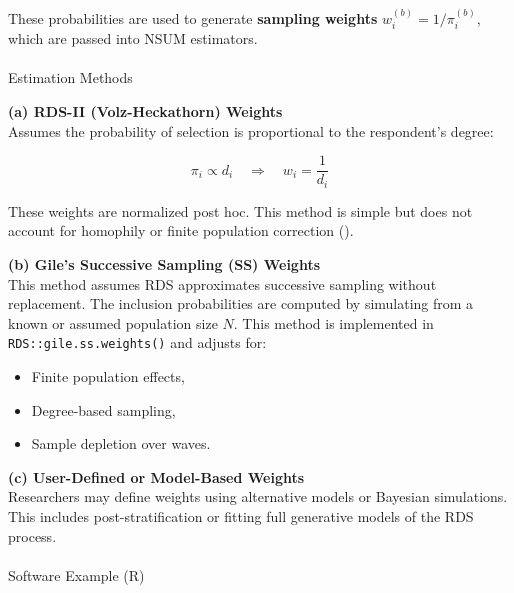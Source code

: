 \documentclass[
  12pt,
  letterpaper,
  DIV=11,
  numbers=noendperiod]{scrartcl}
\makeatletter
\let\oldparagraph\paragraph
\renewcommand{\paragraph}{
    \@ifstar
      \xxxParagraphStar
      \xxxParagraphNoStar
  }
\newcommand{\xxxParagraphStar}[1]{\oldparagraph*{#1}\mbox{}}
\newcommand{\xxxParagraphNoStar}[1]{\oldparagraph{#1}\mbox{}}
\newenvironment{Shaded}{\begin{snugshade}}{\end{snugshade}}
\newcommand{\AttributeTok}[1]{\textcolor[rgb]{0.40,0.45,0.13}{#1}}
\newcommand{\DecValTok}[1]{\textcolor[rgb]{0.68,0.00,0.00}{#1}}
\newcommand{\FunctionTok}[1]{\textcolor[rgb]{0.28,0.35,0.67}{#1}}
\newcommand{\NormalTok}[1]{\textcolor[rgb]{0.00,0.23,0.31}{#1}}
\newcommand{\OtherTok}[1]{\textcolor[rgb]{0.00,0.23,0.31}{#1}}
\newcommand{\SpecialCharTok}[1]{\textcolor[rgb]{0.37,0.37,0.37}{#1}}
\newcommand{\StringTok}[1]{\textcolor[rgb]{0.13,0.47,0.30}{#1}}
\theoremstyle{plain}
\theoremstyle{definition}
\makeatother
\begin{document}
These probabilities are used to generate \textbf{sampling weights}
\(w_i^{(b)} = 1/\pi_i^{(b)}\), which are passed into NSUM estimators.

\paragraph{Estimation Methods}\label{estimation-methods-1}

\textbf{(a) RDS-II (Volz-Heckathorn) Weights}\\
Assumes the probability of selection is proportional to the respondent's
degree:

\[\pi_i \propto d_i \quad \Rightarrow \quad w_i = \frac{1}{d_i}\]

These weights are normalized post hoc. This method is simple but does
not account for homophily or finite population correction
(\textcite{volz08-rds}).

\textbf{(b) Gile's Successive Sampling (SS) Weights}\\
This method assumes RDS approximates successive sampling without
replacement. The inclusion probabilities are computed by simulating from
a known or assumed population size \(N\). This method is implemented in
\texttt{RDS::gile.ss.weights()} and adjusts for:

\begin{itemize}
\item
  Finite population effects,
\item
  Degree-based sampling,
\item
  Sample depletion over waves.
\end{itemize}

\textbf{(c) User-Defined or Model-Based Weights}\\
Researchers may define weights using alternative models or Bayesian
simulations. This includes post-stratification or fitting full
generative models of the RDS process.

\paragraph{Software Example (R)}\label{software-example-r}

\begin{Shaded}
\end{Shaded}
\end{document}
